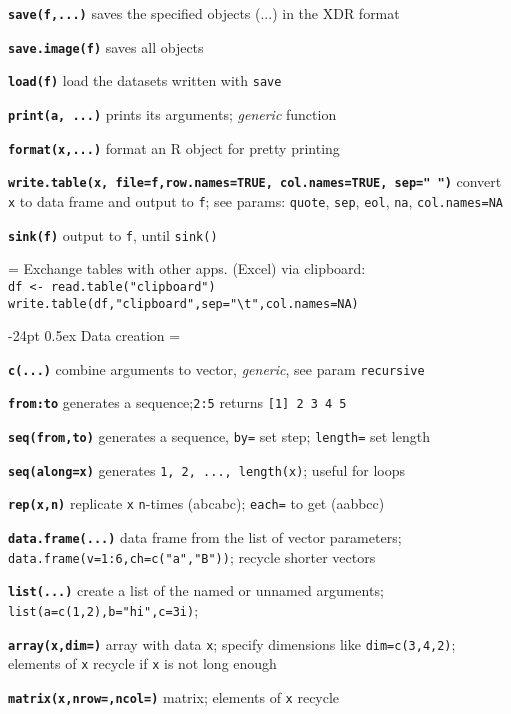 \documentclass[8pt,landscape]{article}
\makeatletter
\renewcommand\section{\@startsection{section}{1}{0mm}%
                                     {-24pt}%
                                     {0.5ex}%
                                {\color{blue}\normalfont\large\bfseries}}
\newcommand{\code}{\texttt}
\newcommand{\bcode}[1]{\texttt{\textbf{#1}}}
\makeatother
\begin{document}
\begin{multicols*}{3}
\bcode{save(f,...)} saves the specified objects (...) in the XDR format

\bcode{save.image(f)} saves all objects

\bcode{load(f)} load the datasets written with \code{save}

\bcode{print(a, ...)} prints its arguments; \emph{generic} function

\bcode{format(x,...)} format an R object for pretty printing

\bcode{write.table(x, file=f,row.names=TRUE, col.names=TRUE, sep=" ")} 
convert \code{x} to data frame and output to \code{f}; see params: \code{quote}, \code{sep}, \code{eol}, \code{na}, \code{col.names=NA}

\bcode{sink(f)} output to \code{f}, until \code{sink()}

\everypar={\hangindent=0mm}
Exchange tables with other apps. (Excel) via clipboard: \\
\code{df <- read.table("clipboard")}\\
\code{write.table(df,"clipboard",sep="\textbackslash t",col.names=NA)}


\section{Data creation}
\everypar={\hangindent=9mm}

\bcode{c(...)} combine arguments to vector, \emph{generic}, see param \code{recursive}


\bcode{from:to} generates a sequence;\code{2:5} returns \code{[1] 2 3 4 5}

\bcode{seq(from,to)} generates a sequence, \code{by=} set step; \code{length=} set length

\bcode{seq(along=x)} generates \code{1, 2, ..., length(x)}; useful for loops

\bcode{rep(x,n)} replicate \code{x} \code{n}-times (abcabc); \code{each=} to get (aabbcc)

\bcode{data.frame(...)} data frame from the list of vector parameters; 
  \code{data.frame(v=1:6,ch=c("a","B"))}; recycle shorter vectors

\bcode{list(...)} create a list of the named or unnamed arguments;
  \code{list(a=c(1,2),b="hi",c=3i)}; 

\bcode{array(x,dim=)} array with data \code{x}; specify
dimensions like \code{dim=c(3,4,2)}; elements of \code{x} recycle if \code{x}
is not long enough

\bcode{matrix(x,nrow=,ncol=)} matrix; elements of \code{x} recycle


\end{multicols*}
\end{document}
